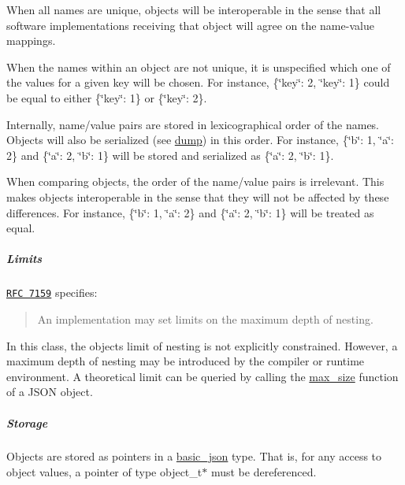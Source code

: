 \begin{DoxyItemize}
\item When all names are unique, objects will be interoperable in the sense that all software implementations receiving that object will agree on the name-\/value mappings.
\item When the names within an object are not unique, it is unspecified which one of the values for a given key will be chosen. For instance, {\ttfamily \{\char`\"{}key\char`\"{}\+: 2, \char`\"{}key\char`\"{}\+: 1\}} could be equal to either {\ttfamily \{\char`\"{}key\char`\"{}\+: 1\}} or {\ttfamily \{\char`\"{}key\char`\"{}\+: 2\}}.
\item Internally, name/value pairs are stored in lexicographical order of the names. Objects will also be serialized (see \hyperlink{classnlohmann_1_1basic__json_ab1ec1c1d1bd4de221a527405d3406556}{dump}) in this order. For instance, {\ttfamily \{\char`\"{}b\char`\"{}\+: 1, \char`\"{}a\char`\"{}\+: 2\}} and {\ttfamily \{\char`\"{}a\char`\"{}\+: 2, \char`\"{}b\char`\"{}\+: 1\}} will be stored and serialized as {\ttfamily \{\char`\"{}a\char`\"{}\+: 2, \char`\"{}b\char`\"{}\+: 1\}}.
\item When comparing objects, the order of the name/value pairs is irrelevant. This makes objects interoperable in the sense that they will not be affected by these differences. For instance, {\ttfamily \{\char`\"{}b\char`\"{}\+: 1, \char`\"{}a\char`\"{}\+: 2\}} and {\ttfamily \{\char`\"{}a\char`\"{}\+: 2, \char`\"{}b\char`\"{}\+: 1\}} will be treated as equal.
\end{DoxyItemize}

\subparagraph*{Limits}

\href{http://rfc7159.net/rfc7159}{\tt R\+FC 7159} specifies\+: \begin{quote}
An implementation may set limits on the maximum depth of nesting. \end{quote}


In this class, the object\textquotesingle{}s limit of nesting is not explicitly constrained. However, a maximum depth of nesting may be introduced by the compiler or runtime environment. A theoretical limit can be queried by calling the \hyperlink{classnlohmann_1_1basic__json_a1b46c6631e30b8394e89bd1546d69736}{max\+\_\+size} function of a J\+S\+ON object.

\subparagraph*{Storage}

Objects are stored as pointers in a \hyperlink{classnlohmann_1_1basic__json}{basic\+\_\+json} type. That is, for any access to object values, a pointer of type {\ttfamily object\+\_\+t$\ast$} must be dereferenced.

